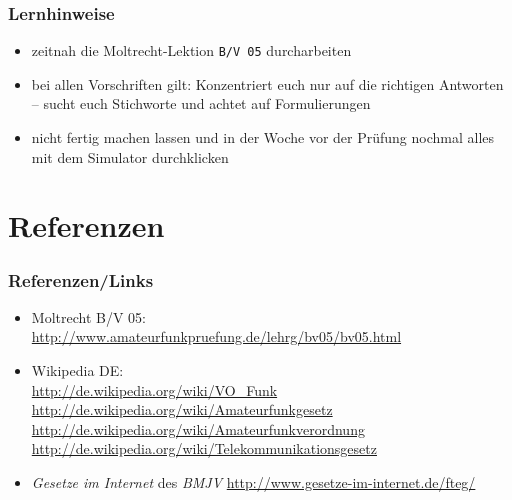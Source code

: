 \begin{frame}
    \frametitle{Lernhinweise}

    \begin{itemize}
        \item zeitnah die Moltrecht-Lektion \texttt{B/V 05} durcharbeiten
        \item bei allen Vorschriften gilt: Konzentriert euch nur auf die
              richtigen Antworten -- sucht euch Stichworte und achtet auf
              Formulierungen
        \item nicht fertig machen lassen und in der Woche vor der Prüfung
              nochmal alles mit dem Simulator durchklicken
    \end{itemize}

\end{frame}

\section{Referenzen}

\begin{frame}
    \frametitle{Referenzen/Links}
    
    \footnotesize
    \begin{itemize}
        \item Moltrecht B/V 05: \\
              \url{http://www.amateurfunkpruefung.de/lehrg/bv05/bv05.html}
        \item Wikipedia DE: \\
              \url{http://de.wikipedia.org/wiki/VO\_Funk} \\
              \url{http://de.wikipedia.org/wiki/Amateurfunkgesetz}
              \url{http://de.wikipedia.org/wiki/Amateurfunkverordnung}
              \url{http://de.wikipedia.org/wiki/Telekommunikationsgesetz}
        \item \emph{Gesetze im Internet} des \emph{BMJV}
              \url{http://www.gesetze-im-internet.de/fteg/}
    \end{itemize}

\end{frame}


